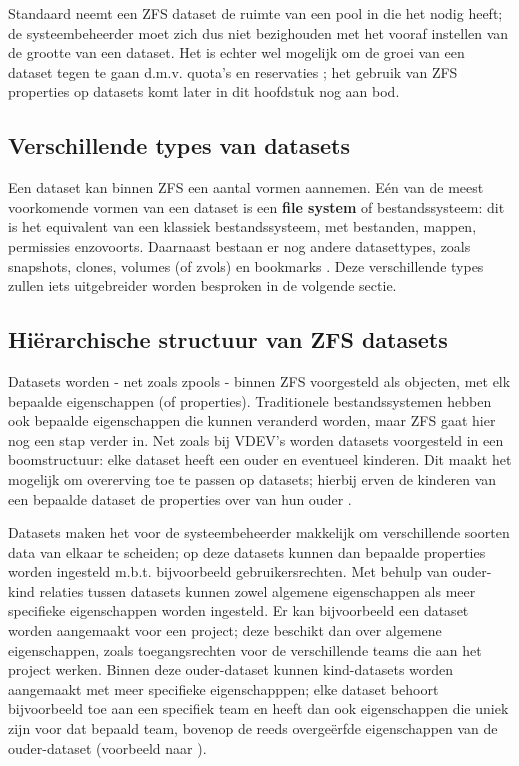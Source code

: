 Standaard neemt een ZFS dataset de ruimte van een pool in die het nodig heeft; de systeembeheerder moet zich dus niet bezighouden met het vooraf instellen van de grootte van een dataset. Het is echter wel mogelijk om de groei van een dataset tegen te gaan d.m.v. quota's en reservaties \autocite{FBSDDP2017}; het gebruik van ZFS properties op datasets komt later in dit hoofdstuk nog aan bod. 

\subsection{Verschillende types van datasets}

Een dataset kan binnen ZFS een aantal vormen aannemen. Eén van de meest voorkomende vormen van een dataset is een \textbf{file system} of bestandssysteem: dit is het equivalent van een klassiek bestandssysteem, met bestanden, mappen, permissies enzovoorts. Daarnaast bestaan er nog andere datasettypes, zoals snapshots, clones, volumes (of zvols) en bookmarks \autocite{Lucas2015}. Deze verschillende types zullen iets uitgebreider worden besproken in de volgende sectie.  

\subsection{Hiërarchische structuur van ZFS datasets}

Datasets worden - net zoals zpools - binnen ZFS voorgesteld als objecten, met elk bepaalde eigenschappen (of properties). Traditionele bestandssystemen hebben ook bepaalde eigenschappen die kunnen veranderd worden, maar ZFS gaat hier nog een stap verder in. Net zoals bij VDEV's worden datasets voorgesteld in een boomstructuur: elke dataset heeft een ouder en eventueel kinderen. Dit maakt het mogelijk om overerving toe te passen op datasets; hierbij erven de kinderen van een bepaalde dataset de properties over van hun ouder \autocite{FBSDDP2017}.

Datasets maken het voor de systeembeheerder makkelijk om verschillende soorten data van elkaar te scheiden; op deze datasets kunnen dan bepaalde properties worden ingesteld m.b.t. bijvoorbeeld gebruikersrechten. Met behulp van ouder-kind relaties tussen datasets kunnen zowel algemene eigenschappen als meer specifieke eigenschappen worden ingesteld. Er kan bijvoorbeeld een dataset worden aangemaakt voor een project; deze beschikt dan over algemene eigenschappen, zoals toegangsrechten voor de verschillende teams die aan het project werken. Binnen deze ouder-dataset kunnen kind-datasets worden aangemaakt met meer specifieke eigenschapppen; elke dataset behoort bijvoorbeeld toe aan een specifiek team en heeft dan ook eigenschappen die uniek zijn voor dat bepaald team, bovenop de reeds overgeërfde eigenschappen van de ouder-dataset (voorbeeld naar \textcite{Lucas2015}).

